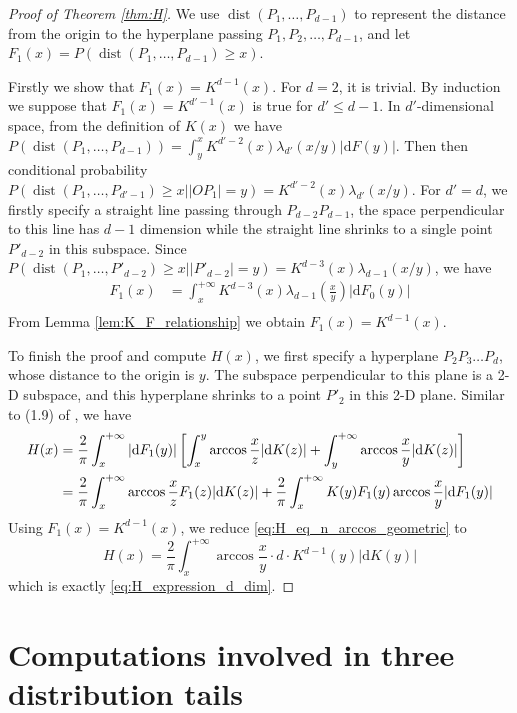 \documentclass{aptpub}
\DeclareMathOperator{\dist}{dist}
\def\d{\mathrm{d}}
\begin{document}
\begin{proof}[Proof of Theorem \ref{thm:H}]
     
We use $\dist(P_1,\dots, P_{d-1})$ to represent
the distance from the origin to the hyperplane passing $P_1,P_2,\dots, P_{d-1}$,
and let $F_1(x)=P(\dist(P_1,\dots, P_{d-1})\geq x)$.


Firstly we show that $F_1(x)=K^{d-1}(x)$.
For $d=2$, it is trivial.
By induction we suppose that $F_1(x)=K^{d'-1}(x)$ is true for
$d'\leq d-1$. In $d'$-dimensional space,
from the definition of $K(x)$ we have $
P(\dist(P_1, \dots, P_{d-1})) = \int_{y}^x K^{d'-2}(x)\lambda_{d'}(x/y)|\d F(y)|
$.
Then then conditional probability $P(\dist(P_1,\dots, P_{d'-1})\geq x \Big\vert |OP_1|=y)
=K^{d'-2}(x)\lambda_{d'}(x/y)$.
For $d'=d$, 
we firstly specify a straight line passing through $P_{d-2}P_{d-1}$,
the space perpendicular 
to this line has $d-1$ dimension while the straight line shrinks to a single point $P'_{d-2}$
in this subspace. Since
$P(\dist(P_1,\dots,P'_{d-2})\geq x \Big\vert |P'_{d-2}|=y)=
K^{d-3}(x)\lambda_{d-1}(x/y)$,
we have
\begin{align*}
    F_1(x) &= \int_x^{+\infty} K^{d-3}(x) \lambda_{d-1}(\frac{x}{y})|\d F_0(y)| \\
\end{align*}
From Lemma \ref{lem:K_F_relationship} we obtain $F_1(x) = K^{d-1}(x)$.

To finish the proof and compute $H(x)$, we first specify a hyperplane $P_2P_3\dots P_{d}$,
whose distance to the origin is $y$. The subspace perpendicular to this plane is a 2-D subspace,
and this hyperplane shrinks to a point $P'_2$ in this 2-D plane.
Similar to (1.9) of \cite{carnal1970konvexe}, we have
\begin{align}\label{eq:H_eq_n_arccos_geometric}
     H(x) &= \frac{2}{\pi}\int_x^{+\infty}|\d F_1(y)|
     \left[ \int_x^y \arccos\frac{x}{z}|\d K(z)|
     +\int_y^{+\infty}\arccos\frac{x}{y} |\d K(z)|\right]\\
     &=\frac{2}{\pi}\int_x^{+\infty} \arccos\frac{x}{z}
     F_1(z)|\d K(z)|+\frac{2}{\pi}\int_{x}^{+\infty} K(y)F_1(y)\arccos\frac{x}{y}|\d F_1(y)| \notag 
 \end{align}
Using $F_1(x)=K^{d-1}(x)$,
we reduce \eqref{eq:H_eq_n_arccos_geometric} to
 $$
 H(x) = \frac{2}{\pi}\int_x^{+\infty}  \arccos\frac{x}{y}\cdot
 d\cdot  K^{d-1}(y) |\d K(y)|
 $$
 which is exactly \eqref{eq:H_expression_d_dim}.
 
\end{proof}
\section{Computations involved in three distribution tails}
\end{document}
